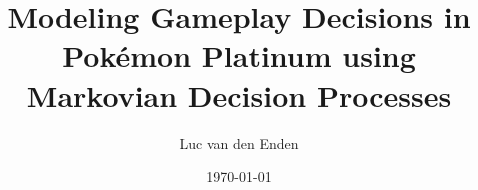 \title{Modeling Gameplay Decisions in Pokémon Platinum using Markovian Decision Processes}

\author{Luc van den Enden}
\date{\today}

\maketitle